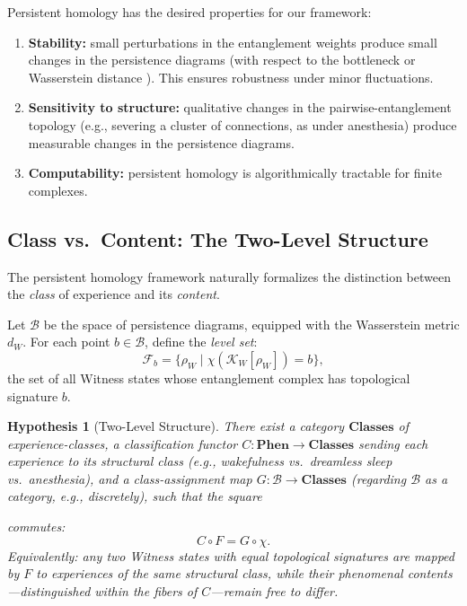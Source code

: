 \documentclass[11pt, a4paper]{article}
\newtheorem{hypothesis}{Hypothesis}
\begin{document}
Persistent homology has the desired properties for our framework:
\begin{enumerate}[label=(\roman*)]
    \item \textbf{Stability:} small perturbations in the entanglement weights produce small changes in the persistence diagrams (with respect to the bottleneck or Wasserstein distance \cite{CohenSteiner2007}). This ensures robustness under minor fluctuations.
    \item \textbf{Sensitivity to structure:} qualitative changes in the pairwise-entanglement topology (e.g., severing a cluster of connections, as under anesthesia) produce measurable changes in the persistence diagrams.
    \item \textbf{Computability:} persistent homology is algorithmically tractable for finite complexes.
\end{enumerate}

\subsection{Class vs.\ Content: The Two-Level Structure}
\label{sec:twolevel}

The persistent homology framework naturally formalizes the distinction between the \emph{class} of experience and its \emph{content}.

Let $\mathcal{B}$ be the space of persistence diagrams, equipped with the Wasserstein metric $d_W$. For each point $b \in \mathcal{B}$, define the \emph{level set}:
\begin{equation}
\mathcal{F}_b = \bigl\{ \rho_W \;\big|\; \chi(\mathcal{K}_W[\rho_W]) = b \bigr\},
\label{eq:levelset}
\end{equation}
the set of all Witness states whose entanglement complex has topological signature $b$.

\begin{hypothesis}[Two-Level Structure]
\label{hyp:twolevel}
There exist a category $\mathbf{Classes}$ of experience-classes, a classification functor $C : \mathbf{Phen} \to \mathbf{Classes}$ sending each experience to its structural class (e.g., wakefulness vs.\ dreamless sleep vs.\ anesthesia), and a class-assignment map $G : \mathcal{B} \to \mathbf{Classes}$ (regarding $\mathcal{B}$ as a category, e.g., discretely), such that the square
\begin{center}
\end{center}
commutes:
\begin{equation}
C \circ F = G \circ \chi.
\label{eq:twoleveleq}
\end{equation}
Equivalently: any two Witness states with equal topological signatures are mapped by $F$ to experiences of the same structural class, while their phenomenal contents---distinguished within the fibers of $C$---remain free to differ.
\end{hypothesis}
\end{document}
